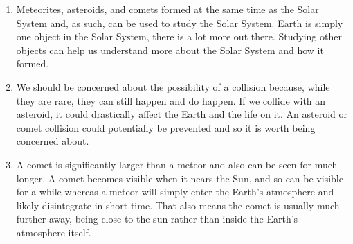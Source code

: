 \documentclass[../hw2.tex]{subfiles}
\begin{document}
\begin{enumerate}
        \item Meteorites, asteroids, and comets formed at the same time as the Solar System and, as such, can be used to study the Solar System. Earth is simply one object in the Solar System, there is a lot more out there. Studying other objects can help us understand more about the Solar System and how it formed.
        \item We should be concerned about the possibility of a collision because, while they are rare, they can still happen and do happen. If we collide with an asteroid, it could drastically affect the Earth and the life on it. An asteroid or comet collision could potentially be prevented and so it is worth being concerned about.
        \item A comet is significantly larger than a meteor and also can be seen for much longer. A comet becomes visible when it nears the Sun, and so can be visible for a while whereas a meteor will simply enter the Earth's atmosphere and likely disintegrate in short time. That also means the comet is usually much further away, being close to the sun rather than inside the Earth's atmosphere itself. 
    \end{enumerate}
\end{document}
